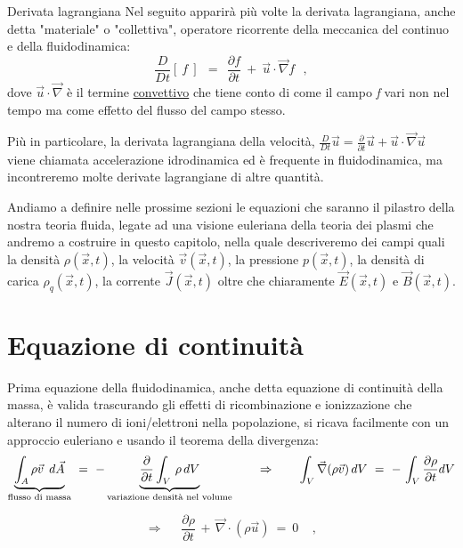 \begin{approfondimento}{Derivata lagrangiana}
	Nel seguito apparirà più volte la derivata lagrangiana, anche detta "materiale" o "collettiva", operatore ricorrente della meccanica del continuo e della fluidodinamica:
	\[ \frac{D}{Dt}[\ \textit{f}\ ]\ \ =\ \ \frac{\partial \textit{f}}{\partial t}\ +\ \vec{u}\cdot\vec{\nabla} \textit{f}\ \ \ , \]
	dove $\vec{u}\cdot\vec{\nabla}$ è il termine \underline{convettivo} che tiene conto di come il campo \textit{f} vari non nel tempo ma come effetto del flusso del campo stesso.
	
	\noindent Più in particolare, la derivata lagrangiana della velocità, $\frac{D}{Dt} \vec{u} = \frac{\partial}{\partial t} \vec{u} + \vec{u}\cdot\vec{\nabla} \vec{u}$ viene chiamata accelerazione idrodinamica ed è frequente in fluidodinamica, ma incontreremo molte derivate lagrangiane di altre quantità.
\end{approfondimento}
\vspace{0.5cm}
Andiamo a definire nelle prossime sezioni le equazioni che saranno il pilastro della nostra teoria fluida, legate ad una visione euleriana della teoria dei plasmi che andremo a costruire in questo capitolo, nella quale descriveremo dei campi quali la densità $\rho(\vec{x}, t)$, la velocità $\vec{v}(\vec x, t)$, la pressione $p(\vec{x}, t)$, la densità di carica $\rho_q(\vec{x}, t)$, la corrente $\vec{J}(\vec{x}, t)$ oltre che chiaramente $\vec{E}(\vec{x}, t)$ e $\vec{B}(\vec{x}, t)$.




\section{Equazione di continuità}
Prima equazione della fluidodinamica, anche detta equazione di continuità della massa, è valida trascurando gli effetti di ricombinazione e ionizzazione che alterano il numero di ioni/elettroni nella popolazione, si ricava facilmente con un approccio euleriano e usando il teorema della divergenza: 
\[\underset{\text{flusso di massa}}{\underbrace{\int_A\rho\vec v\hspace{1mm} \,d\vec A}} \ =\ -\, \underset{\text{variazione densità nel volume}}{\underbrace{\frac{\partial}{\partial t}\int_V\,\rho\, dV}}\ \ \ \ \ \ \Rightarrow\ \ \ \ \ \
\int_V\vec\nabla(\rho \vec v)\,dV\ =\ -\,\int_V\frac{\partial\rho}{\partial t} dV\]

\begin{equation}
	\label{fluid-continuità}
	\Rightarrow \ \ \ \ \ \boxed{ \ 
		\frac{\partial\rho}{\partial t}\, +\, \vec{\nabla} \cdot (\rho \vec u)\ =\ 0\  }\ \ \ \  ,
\end{equation}



